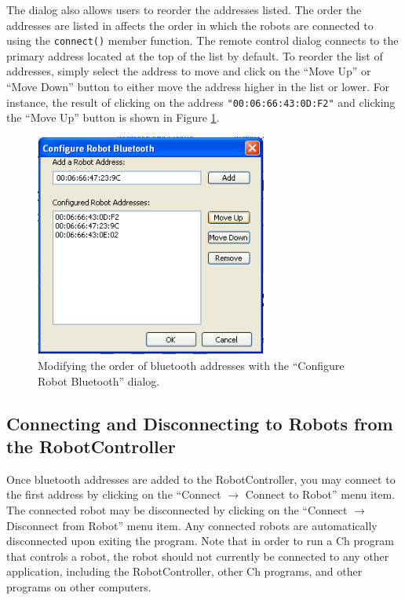 \documentclass{article}
\begin{document}
The dialog also allows users to reorder the addresses listed. The
order the addresses are listed in affects the order in which the robots
are connected to using the \texttt{connect()} member function. 
The remote control dialog connects to the primary address located at the
top of the list by default. To reorder the list of addresses, simply
select the address to move and click on the ``Move Up'' or ``Move Down''
button to either move the address higher in the list or lower. For instance,
the result of clicking on the address \texttt{"00:06:66:43:0D:F2"} and clicking
the ``Move Up'' button is shown in Figure \ref{fig:shot10.png}.

\begin{figure}[H]
\begin{center}
\includegraphics[width=3in]{images/shot10.png}
\end{center}
\caption{\label{fig:shot10.png} Modifying the order of bluetooth addresses with the ``Configure Robot Bluetooth'' dialog.}
\end{figure}

\subsection{Connecting and Disconnecting to Robots from the RobotController}
Once bluetooth addresses are added to the RobotController, you may connect to the 
first address by clicking on the ``Connect $\rightarrow$ Connect to Robot''
menu item. The connected robot may be disconnected by clicking on the 
``Connect $\rightarrow$ Disconnect from Robot'' menu item. Any connected robots are
automatically disconnected upon exiting the program. Note that in order to run a Ch
program that controls a robot, the robot should not currently be connected to any
other application, including the RobotController, other Ch programs, and other
programs on other computers.
\end{document}
